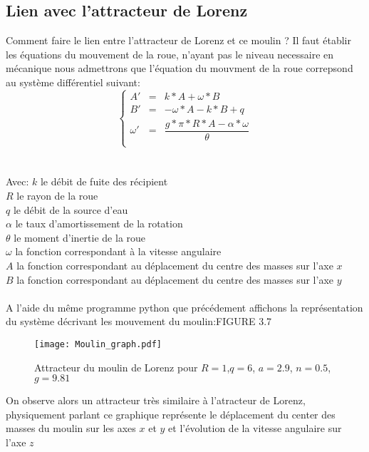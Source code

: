 \subsection{Lien avec l'attracteur de Lorenz}
Comment faire le lien entre l'attracteur de Lorenz et ce moulin ? Il faut établir les équations du mouvement de la roue, n'ayant pas le niveau necessaire en mécanique nous admettrons que l'équation du mouvment de la roue correpsond au système différentiel suivant:\\
\[
    \left\{
    \begin{array}{rcl}
        A'&=&k*A+\omega*B\\
        B'&=&-\omega*A-k*B+q\\
        \omega'&=&\dfrac{g*\pi*R*A-\alpha*\omega}{\theta }\\
    \end{array}
    \right.
\]\\\\
Avec: $k$ le débit de fuite des récipient\\
$R$ le rayon de la roue\\
$q$ le débit de la source d'eau\\
$\alpha$ le taux d'amortissement de la rotation\\
$\theta$ le moment d'inertie de la roue\\
$\omega$ la fonction correspondant à la vitesse angulaire\\
$A$ la fonction correspondant au déplacement du centre des masses sur l'axe $x$\\
$B$ la fonction correspondant au déplacement du centre des masses sur l'axe $y$\\\\

A l'aide du même programme python que précédement affichons la représentation du système décrivant les mouvement du moulin:FIGURE 3.7

\begin{figure}
    \texttt{[image: Moulin\_graph.pdf]}
    \caption{Attracteur du moulin de Lorenz pour $R=1$,$q=6$, $a=2.9$, $n=0.5$, $g=9.81$ } 
\end{figure}

On observe alors un attracteur très similaire à l'atracteur de Lorenz, physiquement parlant ce graphique représente le déplacement du center des masses du moulin sur les axes $x$ et $y$ et l'évolution de la vitesse angulaire sur l'axe $z$\\


